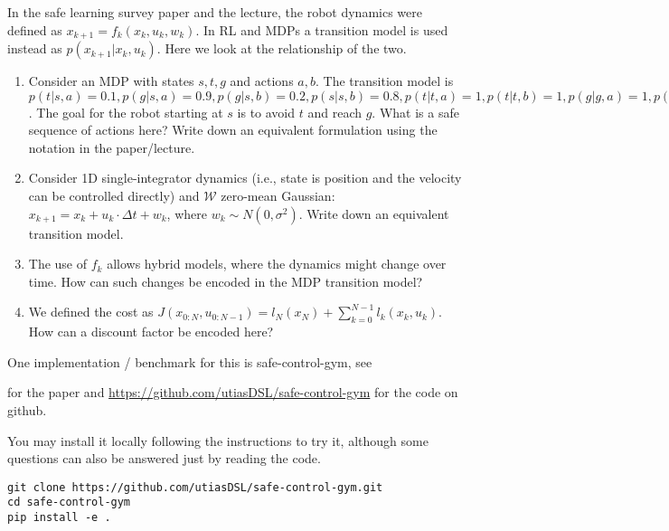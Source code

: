 
In the safe learning survey paper and the lecture, the robot dynamics were defined as $x_{k+1} = f_k(x_k, u_k, w_k)$.
In RL and MDPs a transition model is used instead as $p(x_{k+1}|x_k, u_k)$. Here we look at the relationship of the two.

\begin{enumerate}
\item Consider an MDP with states $s, t, g$ and actions $a,b$. The transition model is $p(t|s,a)=0.1, p(g|s,a)=0.9, p(g|s,b)=0.2, p(s|s,b)=0.8, p(t|t,a)=1, p(t|t,b)=1, p(g|g,a)=1, p(g|g,b)=1$. The goal for the robot starting at $s$ is to avoid $t$ and reach $g$. What is a safe sequence of actions here? Write down an equivalent formulation using the notation in the paper/lecture.


\item Consider 1D single-integrator dynamics (i.e., state is position and the velocity can be controlled directly) and $\mathcal W$ zero-mean Gaussian: $x_{k+1} = x_k + u_k \cdot \Delta t + w_k$, where $w_k \sim N(0, \sigma^2)$. Write down an equivalent transition model.


\item The use of $f_k$ allows hybrid models, where the dynamics might change over time. How can such changes be encoded in the MDP transition model?


\item We defined the cost as $J(x_{0:N}, u_{0:N-1}) = l_N(x_N) + \sum_{k=0}^{N-1} l_k(x_k, u_k)$. How can a discount factor be encoded here?

\end{enumerate}



One implementation / benchmark for this is safe-control-gym, see


for the paper and {\urlfont\url{https://github.com/utiasDSL/safe-control-gym}} for the code on github.

You may install it locally following the instructions to try it, although some questions can also be answered just by reading the code.

\begin{code}
\begin{Verbatim}[numbers=none,fontsize=\footnotesize]
git clone https://github.com/utiasDSL/safe-control-gym.git
cd safe-control-gym
pip install -e .
\end{Verbatim}
\end{code}

